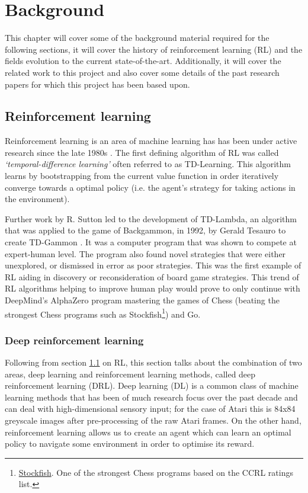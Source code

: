 \chapter{Background}
\label{cha:bg}

This chapter will cover some of the background material required for the following sections, it will cover the history of reinforcement learning (RL) and the fields evolution to the current state-of-the-art. Additionally, it will cover the related work to this project and also cover some details of the past research papers for which this project has been based upon.

\section{Reinforcement learning}
\label{bg:sec:rl}
Reinforcement learning is an area of machine learning has has been under active research since the late 1980s \cite{watkins-phd}. The first defining algorithm of RL was called \textit{`temporal-difference learning'} often referred to as TD-Learning. This algorithm learns by bootstrapping from the current value function in order iteratively converge towards a optimal policy (i.e. the agent's strategy for taking actions in the environment).

Further work by R. Sutton led to the development of TD-Lambda, an algorithm that was applied to the game of Backgammon, in 1992, by Gerald Tesauro to create TD-Gammon \cite{td-gammon}. It was a computer program that was shown to compete at expert-human level. The program also found novel strategies that were either unexplored, or dismissed in error as poor strategies. This was the first example of RL aiding in discovery or reconsideration of board game strategies. This trend of RL algorithms helping to improve human play would prove to only continue with DeepMind's AlphaZero program mastering the games of Chess (beating the strongest Chess programs such as Stockfish\footnote{\href{https://stockfishchess.org}{Stockfish}. One of the strongest Chess programs based on the CCRL ratings list.}) and Go.

\subsection{Deep reinforcement learning}
\label{bg:sec:deeprl}
Following from section \ref{bg:sec:rl} on RL, this section talks about the combination of two areas, deep learning and reinforcement learning methods, called deep reinforcement learning (DRL). Deep learning (DL) is a common class of machine learning methods that has been of much research focus over the past decade and can deal with high-dimensional sensory input; for the case of Atari this is 84x84 greyscale images after pre-processing of the raw Atari frames. On the other hand, reinforcement learning allows us to create an agent which can learn an optimal policy to navigate some environment in order to optimise its reward.

